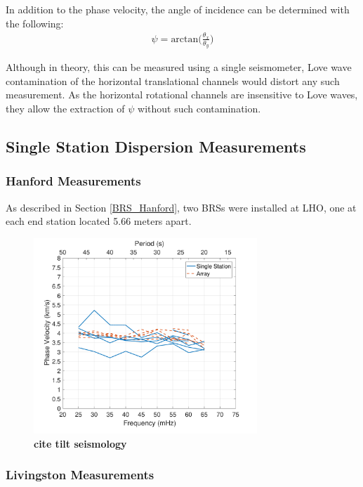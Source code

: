 \documentclass [12pt, proquest]{uwthesis}[2019]
\begin{document}
In addition to the phase velocity, the angle of incidence can be determined with the following:
\begin{align}
\psi=\text{arctan}\bigg(\frac{\theta_x}{\theta_y}\bigg)
\end{align}

Although in theory, this can be measured using a single seismometer, Love wave contamination of the horizontal translational channels would distort any such measurement. As the horizontal rotational channels are insensitive to Love waves, they allow the extraction of $\psi$ without such contamination.  

\subsection{Single Station Dispersion Measurements}
\subsubsection{Hanford Measurements}
As described in Section \ref{BRS_Hanford}, two BRSs were installed at LHO, one at each end station located 5.66 meters apart. 
 
\begin{figure}%
\begin{center}
\includegraphics[width=0.75\textwidth]{Vel.pdf}
\caption{\textbf{cite tilt seismology}}
\label{Phase_Hanford}
\end{center}
\end{figure}

\subsubsection{Livingston Measurements}
\end{document}
